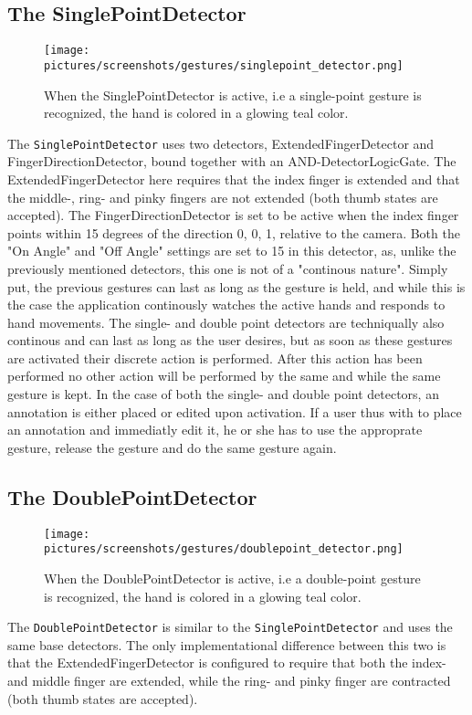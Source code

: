 \subsection{The SinglePointDetector}
\begin{figure}%
	\texttt{[image: pictures/screenshots/gestures/singlepoint\_detector.png]}
	\caption[The single-point gesture]{When the SinglePointDetector is active, i.e a single-point gesture is recognized, the hand is colored in a glowing teal color.}
	\label{fig:singlepoint_detector}
\end{figure} 
The \texttt{SinglePointDetector} uses two detectors, ExtendedFingerDetector and FingerDirectionDetector, bound together with an AND-DetectorLogicGate.
The ExtendedFingerDetector here requires that the index finger is extended and that the middle-, ring- and pinky fingers are not extended (both thumb states are accepted).
The FingerDirectionDetector is set to be active when the index finger points within 15 degrees of the direction {0, 0, 1}, relative to the camera.
Both the "On Angle" and "Off Angle" settings are set to 15 in this detector, as, unlike the previously mentioned detectors, this one is not of a "continous nature".
Simply put, the previous gestures can last as long as the gesture is held, and while this is the case the application continously watches the active hands and responds to
hand movements. The single- and double point detectors are techniqually also continous and can last as long as the user desires, 
but as soon as these gestures are activated their discrete action is performed. After this action has been performed no other action will be performed by the same
and while the same gesture is kept. In the case of both the single- and double point detectors, an annotation is either placed or edited upon activation. 
If a user thus with to place an annotation and immediatly edit it, he or she has to use the approprate gesture, release the gesture and do the same gesture again.

\subsection{The DoublePointDetector}
\begin{figure}%
	\texttt{[image: pictures/screenshots/gestures/doublepoint\_detector.png]}
	\caption[The double-point gesture]{When the DoublePointDetector is active, i.e a double-point gesture is recognized, the hand is colored in a glowing teal color.}
	\label{fig:doublepoint_detector}
\end{figure} 
The \texttt{DoublePointDetector} is similar to the \texttt{SinglePointDetector} and uses the same base detectors. 
The only implementational difference between this two is that the ExtendedFingerDetector is configured to require that both the index- and middle finger are extended, while
the ring- and pinky finger are contracted (both thumb states are accepted).


